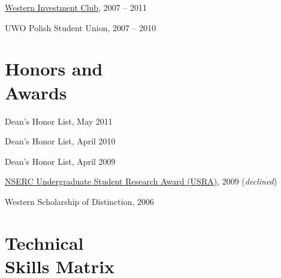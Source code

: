\documentclass[margin,line]{resume}
\begin{document}
\begin{resume}
\begin{list2}
	\item \href{http://www.westerninvestmentclub.com/}{Western Investment Club}, 2007 -- 2011
	\item UWO Polish Student Union, 2007 -- 2010
\end{list2}

\section{\mysidestyle Honors and\\Awards}

\begin{list2}
	\item Dean's Honor List, May 2011
	\item Dean's Honor List, April 2010
	\item Dean's Honor List, April 2009
	\item \href{http://www.uwo.ca/research/funding/internal/nserc_usra.html}{NSERC Undergraduate Student Research Award (USRA)}, 2009	\hfill(\textsl{declined})
	\item Western Scholarship of Distinction, 2006 
\end{list2}


\newpage


\section{\mysidestyle Technical\\Skills Matrix} 

\begin{tabular}{@{}p{1.75in}p{1.75in}p{1.75in}}


\end{tabular}
\end{resume}
\end{document}

